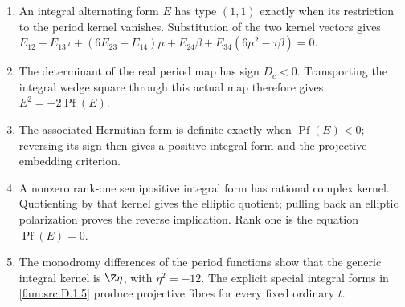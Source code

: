 \RungOne
\begin{enumerate}[label=\arabic*.]
\item An integral alternating form $E$ has type $(1,1)$ exactly
when its restriction to the period kernel vanishes. Substitution of
the two kernel vectors gives
$E_{12}-E_{13}\tau+(6E_{23}-E_{14})\mu+E_{24}\beta
+E_{34}(6\mu^2-\tau\beta)=0$.
\item The determinant of the real period map has sign $D_c<0$.
Transporting the integral wedge square through this actual map
therefore gives $E^2=-2\operatorname{Pf}(E)$.
\item The associated Hermitian form is definite exactly when
$\operatorname{Pf}(E)<0$; reversing its sign then gives a positive
integral form and the projective embedding criterion.
\item A nonzero rank-one semipositive integral form has rational
complex kernel. Quotienting by that kernel gives the elliptic
quotient; pulling back an elliptic polarization proves the reverse
implication. Rank one is the equation $\operatorname{Pf}(E)=0$.
\item The monodromy differences of the period functions show that
the generic integral kernel is $\Z\eta$, with $\eta^2=-12$.
The explicit special integral forms in \ref{fam:src:D.1.5}
produce projective fibres for every fixed ordinary $t$.
\end{enumerate}

